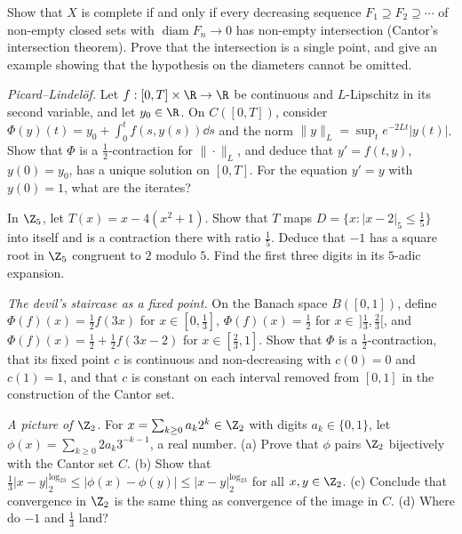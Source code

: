 \begin{exercise}[$\star\star$]\label{ex:cantorinter}
Show that $X$ is complete if and only if every decreasing sequence $F_1\supseteq F_2\supseteq\cdots$ of non-empty closed sets with $\operatorname{diam}F_n\to0$ has non-empty intersection (Cantor's intersection theorem). Prove that the intersection is a single point, and give an example showing that the hypothesis on the diameters cannot be omitted.
\end{exercise}

\begin{exercise}[$\star\star$]\label{ex:picard}
\emph{Picard--Lindel\"of.} Let $f:[0,T]\times\R\to\R$ be continuous and $L$-Lipschitz in its second variable, and let $y_0\in\R$. On $C([0,T])$, consider $\Phi(y)(t)=y_0+\int_0^tf(s,y(s))\dd s$ and the norm $\|y\|_L=\sup_te^{-2Lt}|y(t)|$. Show that $\Phi$ is a $\frac12$-contraction for $\|\cdot\|_L$, and deduce that $y'=f(t,y)$, $y(0)=y_0$, has a unique solution on $[0,T]$. For the equation $y'=y$ with $y(0)=1$, what are the iterates?
\end{exercise}

\begin{exercise}[$\star\star$]\label{ex:hensel}
In $\Z_5$, let $T(x)=x-4(x^2+1)$. Show that $T$ maps $D=\{x:|x-2|_5\le\frac15\}$ into itself and is a contraction there with ratio $\frac15$. Deduce that $-1$ has a square root in $\Z_5$ congruent to $2$ modulo $5$. Find the first three digits in its $5$-adic expansion.
\end{exercise}

\begin{exercise}[$\star\star\star$]\label{ex:devil}
\emph{The devil's staircase as a fixed point.} On the Banach space $B([0,1])$, define $\Phi(f)(x)=\frac12f(3x)$ for $x\in[0,\frac13]$, $\Phi(f)(x)=\frac12$ for $x\in\,]\frac13,\frac23[$, and $\Phi(f)(x)=\frac12+\frac12f(3x-2)$ for $x\in[\frac23,1]$. Show that $\Phi$ is a $\frac12$-contraction, that its fixed point $c$ is continuous and non-decreasing with $c(0)=0$ and $c(1)=1$, and that $c$ is constant on each interval removed from $[0,1]$ in the construction of the Cantor set.
\end{exercise}

\begin{exercise}[$\star\star$]\label{ex:Z2cantor}
\emph{A picture of $\Z_2$.} For $x=\sum_{k\ge0}a_k2^k\in\Z_2$ with digits $a_k\in\{0,1\}$, let $\phi(x)=\sum_{k\ge0}2a_k3^{-k-1}$, a real number. (a) Prove that $\phi$ pairs $\Z_2$ bijectively with the Cantor set $C$. (b) Show that $\frac13|x-y|_2^{\log_23}\le|\phi(x)-\phi(y)|\le|x-y|_2^{\log_23}$ for all $x,y\in\Z_2$. (c) Conclude that convergence in $\Z_2$ is the same thing as convergence of the image in $C$. (d) Where do $-1$ and $\frac13$ land?
\end{exercise}

